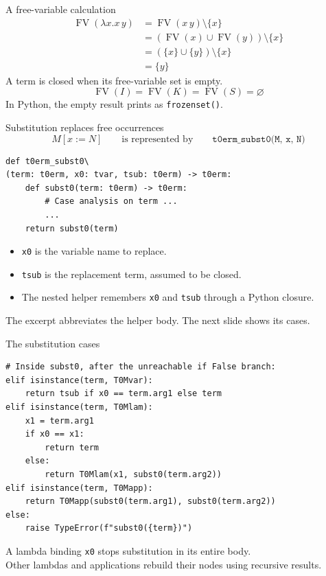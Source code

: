 \documentclass[aspectratio=169,11pt]{beamer}
\newcommand{\FV}{\operatorname{FV}}
\begin{document}
\begin{frame}{A free-variable calculation}
\begin{align*}
\FV(\lambda x.x\,y)
 &= \FV(x\,y)\setminus\{x\}\\
 &= (\FV(x)\cup\FV(y))\setminus\{x\}\\
 &= (\{x\}\cup\{y\})\setminus\{x\}\\
 &= \{y\}
\end{align*}
A term is \alert{closed} when its free-variable set is empty.
\[
\FV(I)=\FV(K)=\FV(S)=\varnothing
\]
In Python, the empty result prints as \texttt{frozenset()}.
\end{frame}

\begin{frame}[fragile]{Substitution replaces free occurrences}
\[
M[x:=N]\qquad\text{is represented by}\qquad
\texttt{t0erm\_subst0(M, x, N)}
\]
\begin{lstlisting}
def t0erm_subst0\
(term: t0erm, x0: tvar, tsub: t0erm) -> t0erm:
    def subst0(term: t0erm) -> t0erm:
        # Case analysis on term ...
        ...
    return subst0(term)
\end{lstlisting}
\begin{itemize}
\item \texttt{x0} is the variable name to replace.
\item \texttt{tsub} is the replacement term, assumed to be closed.
\item The nested helper remembers \texttt{x0} and \texttt{tsub} through a Python closure.
\end{itemize}
The excerpt abbreviates the helper body. The next slide shows its cases.
\end{frame}

\begin{frame}[fragile]{The substitution cases}
\begin{lstlisting}
# Inside subst0, after the unreachable if False branch:
elif isinstance(term, T0Mvar):
    return tsub if x0 == term.arg1 else term
elif isinstance(term, T0Mlam):
    x1 = term.arg1
    if x0 == x1:
        return term
    else:
        return T0Mlam(x1, subst0(term.arg2))
elif isinstance(term, T0Mapp):
    return T0Mapp(subst0(term.arg1), subst0(term.arg2))
else:
    raise TypeError(f"subst0({term})")
\end{lstlisting}
A lambda binding \texttt{x0} stops substitution in its entire body.\\
Other lambdas and applications rebuild their nodes using recursive results.
\end{frame}
\end{document}
